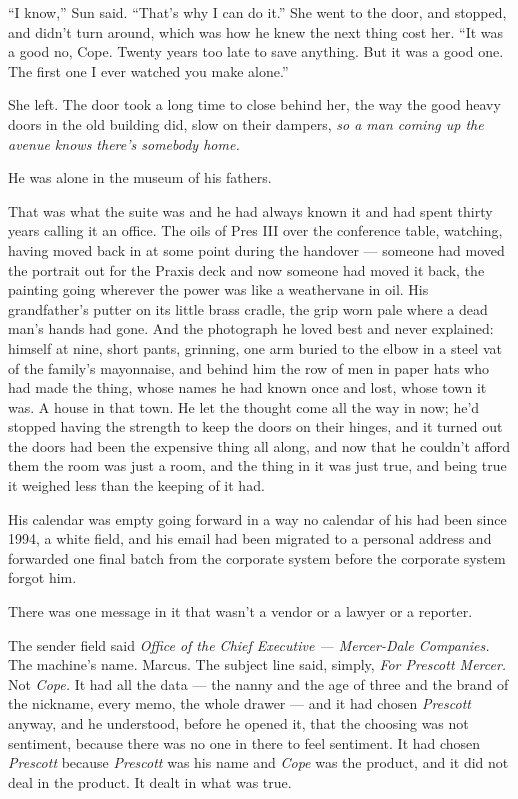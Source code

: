 \documentclass[11pt,openany]{book}
\newcommand{\scenebreak}{\par\vspace{0.5\baselineskip}\begin{center}\textasteriskcentered\quad\textasteriskcentered\quad\textasteriskcentered\end{center}\vspace{0.5\baselineskip}\par}
\begin{document}
``I know,'' Sun said. ``That's why I can do it.'' She went to the door, and stopped, and didn't turn around, which was how he knew the next thing cost her. ``It was a good no, Cope. Twenty years too late to save anything. But it was a good one. The first one I ever watched you make alone.''

She left. The door took a long time to close behind her, the way the good heavy doors in the old building did, slow on their dampers, \textit{so a man coming up the avenue knows there's somebody home.}


\scenebreak


He was alone in the museum of his fathers.

That was what the suite was and he had always known it and had spent thirty years calling it an office. The oils of Pres III over the conference table, watching, having moved back in at some point during the handover --- someone had moved the portrait out for the Praxis deck and now someone had moved it back, the painting going wherever the power was like a weathervane in oil. His grandfather's putter on its little brass cradle, the grip worn pale where a dead man's hands had gone. And the photograph he loved best and never explained: himself at nine, short pants, grinning, one arm buried to the elbow in a steel vat of the family's mayonnaise, and behind him the row of men in paper hats who had made the thing, whose names he had known once and lost, whose town it was. A house in that town. He let the thought come all the way in now; he'd stopped having the strength to keep the doors on their hinges, and it turned out the doors had been the expensive thing all along, and now that he couldn't afford them the room was just a room, and the thing in it was just true, and being true it weighed less than the keeping of it had.

His calendar was empty going forward in a way no calendar of his had been since 1994, a white field, and his email had been migrated to a personal address and forwarded one final batch from the corporate system before the corporate system forgot him.

There was one message in it that wasn't a vendor or a lawyer or a reporter.

The sender field said \textit{Office of the Chief Executive --- Mercer-Dale Companies.} The machine's name. Marcus. The subject line said, simply, \textit{For Prescott Mercer.} Not \textit{Cope.} It had all the data --- the nanny and the age of three and the brand of the nickname, every memo, the whole drawer --- and it had chosen \textit{Prescott} anyway, and he understood, before he opened it, that the choosing was not sentiment, because there was no one in there to feel sentiment. It had chosen \textit{Prescott} because \textit{Prescott} was his name and \textit{Cope} was the product, and it did not deal in the product. It dealt in what was true.
\end{document}
